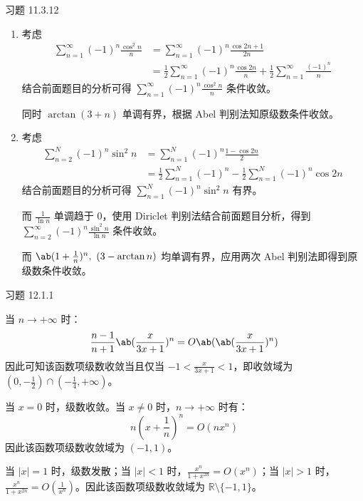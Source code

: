 \begin{problem}
    习题 11.3.12
    \begin{solution}
        \begin{enumerate}
            \item[\textbf{2)}] 考虑
            $$
            \begin{aligned}
                \sum_{n = 1}^{\infty} (-1)^{n} \frac{\cos^2 n}{n} & = \sum_{n = 1}^{\infty} (-1)^{n} \frac{\cos 2n + 1}{2 n} \\
                & = \frac{1}{2} \sum_{n = 1}^{\infty} (-1)^{n} \frac{\cos 2n}{n} + \frac{1}{2} \sum_{n = 1}^{\infty} \frac{(-1)^{n}}{n}
            \end{aligned}
            $$
            结合前面题目的分析可得 $\sum\limits_{n = 1}^{\infty} (-1)^{n} \frac{\cos^2 n}{n}$ 条件收敛。

            同时 $\arctan (3 + n)$ 单调有界，根据 Abel 判别法知原级数条件收敛。

            \item[\textbf{3)}] 考虑
            $$
            \begin{aligned}
                \sum_{n = 2}^{N} (-1)^{n} \sin^2 n & = \sum_{n = 1}^{N} (-1)^{n} \frac{1 - \cos 2n}{2} \\
                & = \frac{1}{2} \sum_{n = 1}^{N} (-1)^{n} - \frac{1}{2} \sum_{n = 1}^{N} (-1)^{n} \cos 2n
            \end{aligned}
            $$
            结合前面题目的分析可得 $\sum\limits_{n = 1}^{N} (-1)^{n} \sin^2 n$ 有界。

            而 $\frac{1}{\ln n}$ 单调趋于 $0$，使用 Diriclet 判别法结合前面题目分析，得到 $\sum\limits_{n = 2}^{\infty} (-1)^{n} \frac{\sin^2 n}{\ln n}$ 条件收敛。

            而 $\ab(1 + \frac{1}{n})^{n},\ (3 - \arctan n)$ 均单调有界，应用两次 Abel 判别法即得到原级数条件收敛。
        \end{enumerate}
    \end{solution}
\end{problem}

\begin{problem}
    习题 12.1.1
    \begin{solution}
        \item[\textbf{1)}] 当 $n \to + \infty$ 时：
        $$
        \frac{n - 1}{n + 1} \ab(\frac{x}{3x + 1})^{n} = O\ab(\ab(\frac{x}{3x + 1})^{n})
        $$
        因此可知该函数项级数收敛当且仅当 $-1 < \frac{x}{3x + 1} < 1$，即收敛域为 $(0, -\frac{1}{2}) \cap (-\frac{1}{4}, +\infty)$。

        \item[\textbf{2)}] 当 $x = 0$ 时，级数收敛。当 $x \neq 0$ 时，$n \to + \infty$ 时有：
        $$
        n (x + \frac{1}{n})^{n} = O(n x^{n})
        $$
        因此该函数项级数收敛域为 $(-1, 1)$。

        \item[\textbf{4)}] 当 $|x| = 1$ 时，级数发散；当 $|x| < 1$ 时，$\frac{x^{n}}{1 + x^{2n}} = O(x^{n})$；当 $|x| > 1$ 时，$\frac{x^{n}}{1 + x^{2n}} = O(\frac{1}{x^{n}})$。因此该函数项级数收敛域为 $\mathbb{R} \setminus \{-1, 1\}$。
    \end{solution}
\end{problem}

